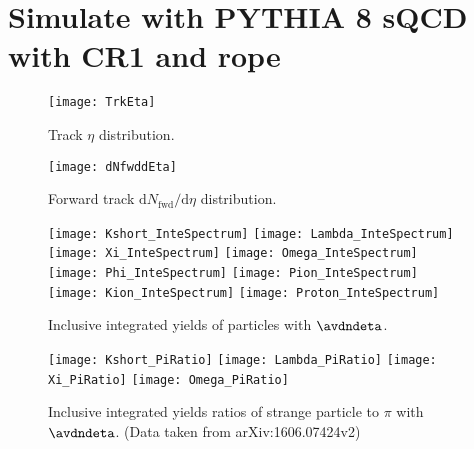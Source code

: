 
\section{Simulate with PYTHIA 8 sQCD with CR1 and rope}%
\label{sec:CRorRope}

\begin{figure}[t]
        \begin{center}
                \texttt{[image: TrkEta]}
        \end{center}
        \caption{Track $\eta$ distribution.}
        \label{fig:TrkEta}
\end{figure}

\begin{figure}[t]
	\begin{center}
		\texttt{[image: dNfwddEta]}
	\end{center}
	\caption{Forward track $\mathrm{d}N_\mathrm{fwd}/\mathrm{d}\eta$ distribution.}
	\label{fig:TrkdNdEta}
\end{figure}

\begin{figure}[ht]
	\begin{center}
		\texttt{[image: Kshort\_InteSpectrum]}
		\texttt{[image: Lambda\_InteSpectrum]}
		\texttt{[image: Xi\_InteSpectrum]}
		\texttt{[image: Omega\_InteSpectrum]}
		\texttt{[image: Phi\_InteSpectrum]}
		\texttt{[image: Pion\_InteSpectrum]}
		\texttt{[image: Kion\_InteSpectrum]}
		\texttt{[image: Proton\_InteSpectrum]}
	\end{center}
	\caption{Inclusive integrated yields of particles with $\avdndeta$.}
	\label{fig:InclIntePar}
\end{figure}

\begin{figure}[ht]
	\begin{center}
		\texttt{[image: Kshort\_PiRatio]}
		\texttt{[image: Lambda\_PiRatio]}
		\texttt{[image: Xi\_PiRatio]}
		\texttt{[image: Omega\_PiRatio]}
	\end{center}
	\caption{Inclusive integrated yields ratios of strange particle to $\pi$ with $\avdndeta$. (Data taken from arXiv:1606.07424v2)}
	\label{fig:InclIntePartoPiRatio}
\end{figure}

